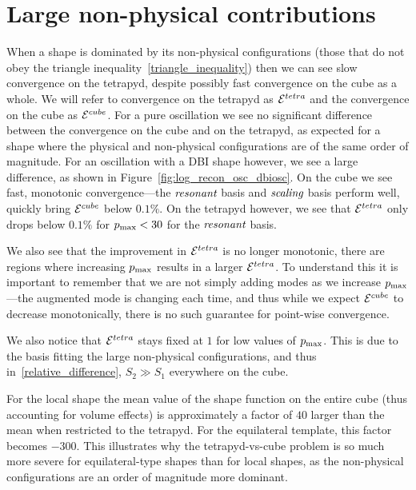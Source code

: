\section{Large non-physical contributions}\label{large_non_physical}
    When a shape is dominated by its non-physical configurations
    (those that do not obey the triangle inequality~\eqref{triangle_inequality})
    then we can see slow convergence on the tetrapyd, despite
    possibly fast convergence on the cube as a whole.
    We will refer to convergence on the tetrapyd as $\mathcal{E}^{tetra}$
    and the convergence on the cube as $\mathcal{E}^{cube}$.
    For a pure oscillation we see no significant difference between the convergence on the cube
    and on the tetrapyd, as expected for a shape where the physical and non-physical
    configurations are of the same order of magnitude.
    For an oscillation with a DBI shape however, we see a large difference,
    as shown in Figure~\ref{fig:log_recon_osc_dbiosc}.
    On the cube we see fast, monotonic convergence---the $\textit{resonant}$ basis
    and $\textit{scaling}$ basis perform well, quickly bring $\mathcal{E}^{cube}$
    below $0.1\%$.
    On the tetrapyd however, we see that $\mathcal{E}^{tetra}$ only drops below
    $0.1\%$ for $p_\text{max}<30$ for the $\textit{resonant}$ basis.


    We also see that the improvement in $\mathcal{E}^{tetra}$ is no longer
    monotonic, there are regions where increasing $p_\text{max}$ results in
    a larger $\mathcal{E}^{tetra}$.
    To understand this it is important to remember that we are not simply
    adding modes as we increase $p_\text{max}$---the augmented mode is changing
    each time, and thus while we expect $\mathcal{E}^{cube}$ to decrease monotonically,
    there is no such guarantee for point-wise convergence.


    We also notice that $\mathcal{E}^{tetra}$ stays fixed at $1$ for low values of $p_\text{max}$.
    This is due to the basis fitting the large non-physical configurations,
    and thus in~\eqref{relative_difference}, $S_2 \gg S_1$ everywhere on the cube.


    For the local shape the mean value of the shape function on the entire cube
    (thus accounting for volume effects) is approximately a factor of $40$ larger than the mean
    when restricted to the tetrapyd. For the equilateral template, this factor becomes $-300$.
    This illustrates why the tetrapyd-vs-cube problem is so much more severe for equilateral-type
    shapes than for local shapes, as the non-physical configurations are an order of magnitude
    more dominant.


